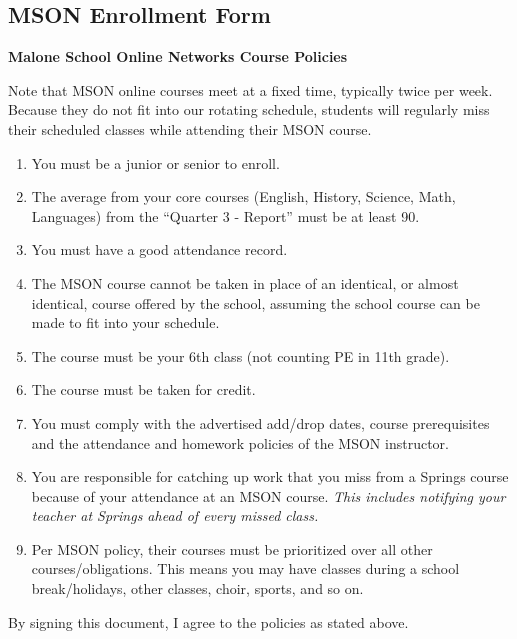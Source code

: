 \vspace{.5cm}

\newpage

\subsection{MSON Enrollment Form}

\noindent \textbf{Malone School Online Networks Course Policies}


Note that MSON online courses meet at a fixed time, typically twice per week.  Because they do not fit into our rotating schedule, students will regularly miss their scheduled classes while attending their MSON course. 

\begin{enumerate}\itemsep=0mm
\item You must be a junior or senior to enroll.
\item The average from your core courses (English, History, Science, Math, Languages) from the “Quarter 3 - Report” must be at least 90.
\item You must have a good attendance record. 
\item The MSON course cannot be taken in place of an identical, or almost identical, course offered by the school, assuming the school course can be made to fit into your schedule. 
\item The course must be your 6th class (not counting PE in 11th grade). 
\item The course must be taken for credit. 
\item You must comply with the advertised add/drop dates, course prerequisites and the attendance and homework policies of the MSON instructor. 
\item You are responsible for catching up work that you miss from a Springs course because of your attendance at an MSON course.  \emph{This includes notifying your teacher at Springs ahead of every missed class.}  
\item Per MSON policy, their courses must be prioritized over all other courses/obligations.  This means you may have classes during a school break/holidays, other classes, choir, sports, and so on.  
\end{enumerate}



By signing this document, I agree to the policies as stated above.

\vspace{.75cm}

